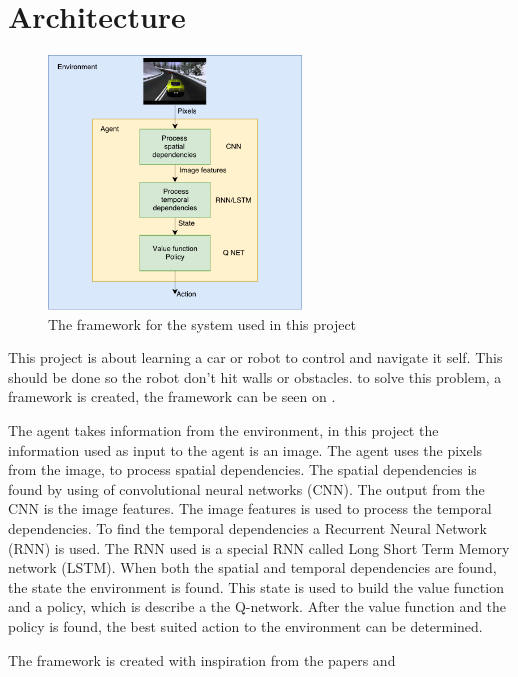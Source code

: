 \chapter{Architecture}
\label{chap:projectdef}



\begin{figure}
	\centering
	\includegraphics[width=0.6\textwidth]{Figures/Architecture/Project_framework_diagram}
	\caption{The framework for the system used in this project}
	\label{fig:Project_framework}
\end{figure}
This project is about learning a car or robot to control and navigate it self. This should be done so the robot don't hit walls or obstacles. to solve this problem, a framework is created, the framework can be seen on .

The agent takes information from the environment, in this project the information used as input to the agent is an image. The agent uses the pixels from the image, to process spatial dependencies. The spatial dependencies is found by using of convolutional neural networks (CNN). The output from the CNN is the image features. The image features is used to process the temporal dependencies. To find the temporal dependencies a Recurrent Neural Network (RNN) is used. The RNN used is a special RNN called Long Short Term Memory network (LSTM). When both the spatial and temporal dependencies are found, the state the environment is found. This state is used to build the value function and a policy, which is describe a the Q-network. After the value function and the policy is found, the best suited action to the environment can be determined.


The framework is created with inspiration from the papers  \cite{DBLP:journals/corr/MnihBMGLHSK16} and \cite{Sallab:2017:2470-1173:70}
\newline








